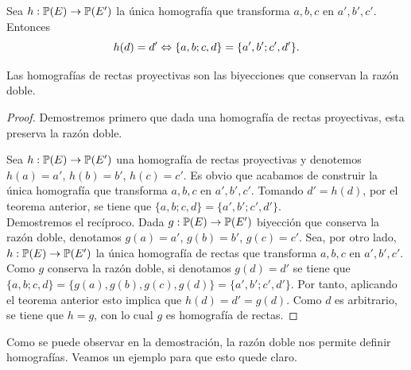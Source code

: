  Sea $h:\mathbb{P}(E)\rightarrow \mathbb{P}(E')$ la única  homografía que transforma $a,b,c$ en $a',b',c'$. Entonces 
\begin{equation}
		h(d)=d' \Leftrightarrow \{a,b;c,d\}=\{a',b';c',d'\}.
\end{equation}
\begin{cor}
	Las homografías de rectas proyectivas son las biyecciones que conservan la razón doble.
\end{cor}
\begin{proof}
	Demostremos primero que dada una homografía de rectas proyectivas, esta preserva la razón doble. 
	
	Sea $h:\mathbb{P}(E)\rightarrow \mathbb{P}(E')$ una homografía de rectas proyectivas y denotemos $h(a)=a'$, $h(b)=b'$, $h(c)=c'$. Es obvio que acabamos de construir la única homografía que transforma $a,b,c$ en $a',b',c'$. Tomando $d'=h(d)$, por el teorema anterior, se tiene que $\{a,b;c,d\}=\{a',b';c',d'\}$.\\
	
	Demostremos el recíproco. Dada $g:\mathbb{P}(E)\rightarrow \mathbb{P}(E')$ biyección que conserva la razón doble, denotamos $g(a)=a'$, $g(b)=b'$, $g(c)=c'$. Sea, por otro lado, $h:\mathbb{P}(E)\rightarrow \mathbb{P}(E')$ la única homografía de rectas que transforma $a,b,c$ en $a',b',c'$. Como $g$ conserva la razón doble, si denotamos $g(d)=d'$ se tiene que $\{a,b;c,d\}= \{g(a),g(b),g(c),g(d)\}=\{a',b';c',d'\}$. Por tanto, aplicando el teorema anterior esto implica que $h(d)=d'=g(d)$. Como $d$ es arbitrario, se tiene que $h=g$, con lo cual $g$ es homografía de rectas.
\end{proof}
Como se puede observar en la demostración, la razón doble nos permite definir homografías. Veamos un ejemplo para que esto quede claro.
